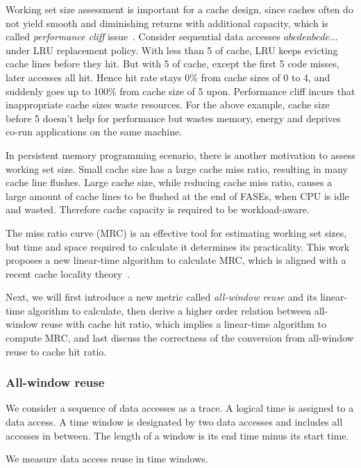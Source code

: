 \documentclass[preprint,nocopyrightspace,10pt]{sigplanconf}
\begin{document}
Working set size assessment is important for a cache design, since
caches often do not yield smooth and diminishing returns with additional capacity,
which is called \emph{performance cliff} issue~\cite{BeckmannS:HPCA15}.
Consider sequential data accesses $abcdeabcde...$ under LRU replacement
policy. With less than 5 of cache, LRU keeps evicting cache lines before they hit.
But with 5 of cache, except the first 5 code misses, later accesses all hit. Hence
hit rate stays 0\% from cache sizes of 0 to 4, and suddenly goes up to 100\% from
cache size of 5 upon. Performance cliff incurs that inappropriate cache sizes waste 
resources. For the above example, cache size before 5 doesn't help for performance
but wastes memory, energy and deprives co-run applications on the same machine.

In persistent memory programming scenario, there is another motivation to assess
working set size. Small cache size has a large cache miss ratio, resulting in many cache
line flushes. Large cache size, while reducing cache miss ratio, causes a large amount 
of cache lines to be flushed at the end of FASEs, when CPU is idle and wasted. 
Therefore cache capacity is required to be workload-aware. 

The miss ratio curve (MRC) is an effective tool for estimating working set sizes, but
time and space required to calculate it determines its practicality. This work proposes
a new linear-time algorithm to calculate MRC, which is aligned with
a recent cache locality theory~\cite{Xiang+:ASPLOS13}. 

Next, we will first introduce a new metric called \emph{all-window reuse} and its 
linear-time algorithm to calculate, then derive a higher order relation between 
all-window reuse with cache hit ratio, which implies a linear-time algorithm to 
compute MRC, and last discuss the correctness of the conversion from all-window 
reuse to cache hit ratio. 

\subsubsection{All-window reuse}

We consider a sequence of data accesses as a trace. A logical 
time is assigned to a data access. A time window is designated 
by two data accesses and includes all accesses in between. 
The length of a window is its end time minus its start time. 

We measure data access reuse in time windows. 
\end{document}
